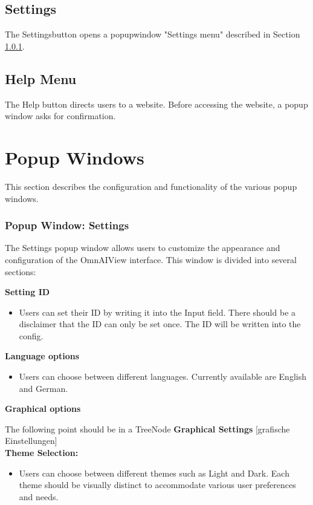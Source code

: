 \documentclass[]{scrreprt}
\begin{document}
\subsection{Settings}
The Settingsbutton opens a popupwindow "Settings menu" described in Section \ref{cap:PopupWindowsettings}.


\subsection{Help Menu}
The Help button directs users to a website. Before accessing the website, a popup window asks for confirmation.


\section{Popup Windows}


This section describes the configuration and functionality of the various popup windows.


\subsubsection{Popup Window: Settings} \label{cap:PopupWindowsettings}


The Settings popup window allows users to customize the appearance and configuration of the OmnAIView interface. This window is divided into several sections:


\textbf{Setting ID}
\begin{itemize}
    \item Users can set their ID by writing it into the Input field. There should be a disclaimer that the ID can only be set once.
    The ID will be written into the config.
\end{itemize}


\textbf{Language options}
\begin{itemize}
  \item  Users can choose between different languages. Currently available are English and German.
\end{itemize}


\textbf{Graphical options}


The following point should be in a TreeNode \textbf{Graphical Settings} [grafische Einstellungen]
\\
\textbf{Theme Selection:}
\begin{itemize}
    \item Users can choose between different themes such as Light and Dark. Each theme should be visually distinct to accommodate various user preferences and needs.
\end{itemize}
\end{document}
